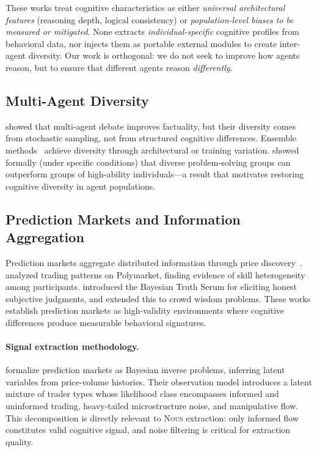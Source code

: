 \documentclass[11pt]{article}
\newcommand{\nous}{\textsc{Nous}}
\begin{document}
These works treat cognitive characteristics as either \emph{universal architectural features} (reasoning depth, logical consistency) or \emph{population-level biases to be measured or mitigated}. None extracts \emph{individual-specific} cognitive profiles from behavioral data, nor injects them as portable external modules to create inter-agent diversity. Our work is orthogonal: we do not seek to improve how agents reason, but to ensure that different agents reason \emph{differently}.

\subsection{Multi-Agent Diversity}

\citet{du2023debate} showed that multi-agent debate improves factuality, but their diversity comes from stochastic sampling, not from structured cognitive differences. Ensemble methods~\citep{lakshminarayanan2017simple} achieve diversity through architectural or training variation. \citet{hong2004groups} showed formally (under specific conditions) that diverse problem-solving groups can outperform groups of high-ability individuals---a result that motivates restoring cognitive diversity in agent populations.

\subsection{Prediction Markets and Information Aggregation}

Prediction markets aggregate distributed information through price discovery~\citep{wolfers2004prediction, arrow2008promise}. \citet{reichenbach2025polymarket} analyzed trading patterns on Polymarket, finding evidence of skill heterogeneity among participants. \citet{prelec2004bayesian} introduced the Bayesian Truth Serum for eliciting honest subjective judgments, and \citet{prelec2017solution} extended this to crowd wisdom problems. These works establish prediction markets as high-validity environments where cognitive differences produce measurable behavioral signatures.

\paragraph{Signal extraction methodology.}
\citet{madrigalcianci2026bayesian} formalize prediction markets as Bayesian inverse problems, inferring latent variables from price-volume histories. Their observation model introduces a latent mixture of trader types whose likelihood class encompasses informed and uninformed trading, heavy-tailed microstructure noise, and manipulative flow. This decomposition is directly relevant to \nous{} extraction: only informed flow constitutes valid cognitive signal, and noise filtering is critical for extraction quality.
\end{document}

